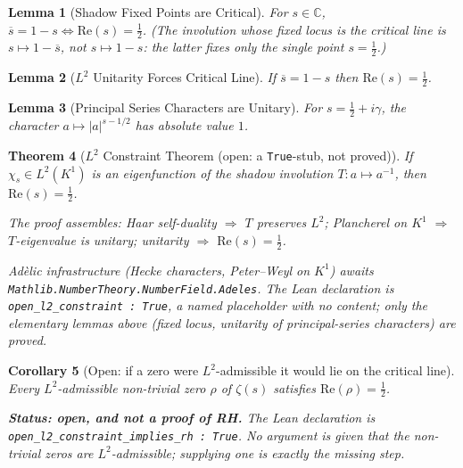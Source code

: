\documentclass{report}
\newtheorem{theorem}{Theorem}[chapter]
\newtheorem{lemma}[theorem]{Lemma}
\newtheorem{corollary}[theorem]{Corollary}
\theoremstyle{definition}
\begin{document}
\begin{lemma}[Shadow Fixed Points are Critical]
  \label{lem:shadow-fixed-critical}
  \leanok
  For $s \in \mathbb{C}$, $\overline{s} = 1 - s \iff \mathrm{Re}(s) = \tfrac{1}{2}$.
  (The involution whose fixed locus is the critical line is $s \mapsto 1-\overline{s}$,
  not $s \mapsto 1-s$: the latter fixes only the single point $s = \tfrac12$.)
\end{lemma}

\begin{lemma}[$L^2$ Unitarity Forces Critical Line]
  \label{lem:l2-unitarity}
  \leanok
  If $\overline{s} = 1 - s$ then $\mathrm{Re}(s) = \tfrac{1}{2}$.
\end{lemma}

\begin{lemma}[Principal Series Characters are Unitary]
  \label{lem:principal-series-unitary}
  \leanok
  For $s = \tfrac{1}{2} + i\gamma$, the character $a \mapsto |a|^{s-1/2}$
  has absolute value $1$.
\end{lemma}

\begin{theorem}[$L^2$ Constraint Theorem (open: a \texttt{True}-stub, not proved)]
  \label{thm:l2-constraint}
  If $\chi_s \in L^2(K^1)$ is an eigenfunction of the shadow involution
  $T: a \mapsto a^{-1}$, then $\mathrm{Re}(s) = \tfrac{1}{2}$.

  The proof assembles: Haar self-duality $\Rightarrow$ $T$ preserves $L^2$;
  Plancherel on $K^1$ $\Rightarrow$ $T$-eigenvalue is unitary;
  unitarity $\Rightarrow$ $\mathrm{Re}(s) = \tfrac{1}{2}$.

  Ad\`elic infrastructure (Hecke characters, Peter--Weyl on $K^1$)
  awaits \texttt{Mathlib.NumberTheory.NumberField.Adeles}. The Lean declaration is
  \texttt{open\_l2\_constraint : True}, a named placeholder with no content; only the
  elementary lemmas above (fixed locus, unitarity of principal-series characters) are proved.
\end{theorem}

\begin{corollary}[Open: if a zero were $L^2$-admissible it would lie on the critical line]
  \label{cor:l2-rh}
  Every $L^2$-admissible non-trivial zero $\rho$ of $\zeta(s)$ satisfies
  $\mathrm{Re}(\rho) = \tfrac{1}{2}$.

  \textbf{Status: open, and not a proof of RH.} The Lean declaration is
  \texttt{open\_l2\_constraint\_implies\_rh : True}. No argument is given that the
  non-trivial zeros are $L^2$-admissible; supplying one is exactly the missing step.
\end{corollary}
\end{document}
